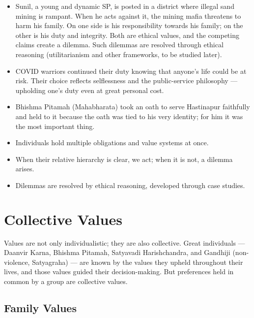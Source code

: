 \begin{ExampleBox}
\begin{itemize}
\item Sunil, a young and dynamic SP, is posted in a district where illegal sand mining is rampant. When he acts against it, the mining mafia threatens to harm his family. On one side is his responsibility towards his family; on the other is his duty and integrity. Both are ethical values, and the competing claims create a dilemma. Such dilemmas are resolved through ethical reasoning (utilitarianism and other frameworks, to be studied later).
\item COVID warriors continued their duty knowing that anyone's life could be at risk. Their choice reflects selflessness and the public-service philosophy --- upholding one's duty even at great personal cost.
\item Bhishma Pitamah (Mahabharata) took an oath to serve Hastinapur faithfully and held to it because the oath was tied to his very identity; for him it was the most important thing.
\end{itemize}
\end{ExampleBox}

\begin{QuickRevision}
\begin{itemize}
\item Individuals hold multiple obligations and value systems at once.
\item When their relative hierarchy is clear, we act; when it is not, a dilemma arises.
\item Dilemmas are resolved by ethical reasoning, developed through case studies.
\end{itemize}
\end{QuickRevision}

\section{Collective Values}

Values are not only individualistic; they are also collective. Great individuals --- Daanvir Karna, Bhishma Pitamah, Satyavadi Harishchandra, and Gandhiji (non-violence, Satyagraha) --- are known by the values they upheld throughout their lives, and those values guided their decision-making. But preferences held in common by a group are collective values.

\subsection{Family Values}

